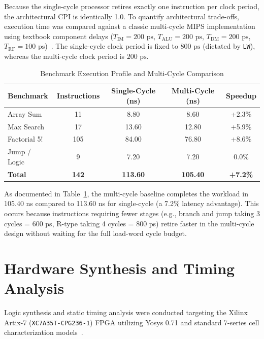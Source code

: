 \documentclass[conference]{IEEEtran}
\begin{document}
Because the single-cycle processor retires exactly one instruction per clock period, the architectural CPI is identically 1.0. To quantify architectural trade-offs, execution time was compared against a classic multi-cycle MIPS implementation using textbook component delays ($T_{\text{IM}} = 200\text{ ps}$, $T_{\text{ALU}} = 200\text{ ps}$, $T_{\text{DM}} = 200\text{ ps}$, $T_{\text{RF}} = 100\text{ ps}$)~\cite{patterson2014}. The single-cycle clock period is fixed to $800\text{ ps}$ (dictated by \texttt{LW}), whereas the multi-cycle clock period is $200\text{ ps}$.

\begin{table}[htbp]
\caption{Benchmark Execution Profile and Multi-Cycle Comparison}
\label{tab:performance}
\begin{center}
\begin{tabular}{lcccc}
\toprule
\textbf{Benchmark} & \textbf{Instructions} & \textbf{Single-Cycle (ns)} & \textbf{Multi-Cycle (ns)} & \textbf{Speedup} \\
\midrule
Array Sum & 11 & 8.80 & 8.60 & +2.3\% \\
Max Search & 17 & 13.60 & 12.80 & +5.9\% \\
Factorial 5! & 105 & 84.00 & 76.80 & +8.6\% \\
Jump / Logic & 9 & 7.20 & 7.20 & 0.0\% \\
\midrule
\textbf{Total} & \textbf{142} & \textbf{113.60} & \textbf{105.40} & \textbf{+7.2\%} \\
\bottomrule
\end{tabular}
\end{center}
\end{table}

As documented in Table~\ref{tab:performance}, the multi-cycle baseline completes the workload in 105.40 ns compared to 113.60 ns for single-cycle (a 7.2\% latency advantage). This occurs because instructions requiring fewer stages (e.g., branch and jump taking 3 cycles = 600 ps, R-type taking 4 cycles = 800 ps) retire faster in the multi-cycle design without waiting for the full load-word cycle budget.

\section{Hardware Synthesis and Timing Analysis}
Logic synthesis and static timing analysis were conducted targeting the Xilinx Artix-7 (\texttt{XC7A35T-CPG236-1}) FPGA utilizing Yosys 0.71 and standard 7-series cell characterization models~\cite{xilinx2016}.
\end{document}
